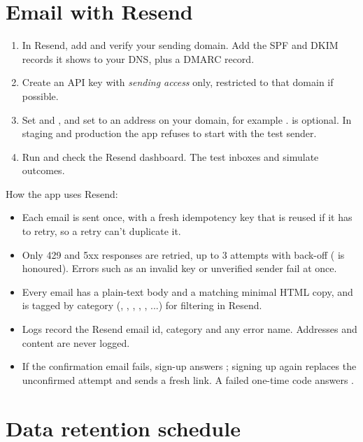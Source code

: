 \section{Email with Resend}
\label{sec:resend-prod}

\begin{enumerate}
  \item In Resend, add and verify your sending domain. Add the SPF and DKIM records it shows to your DNS, plus a DMARC record.
  \item Create an API key with \emph{sending access} only, restricted to that domain if possible.
  \item Set  and , and set  to an address on your domain, for example .  is optional. In staging and production the app refuses to start with the  test sender.
  \item Run  and check the Resend dashboard. The test inboxes  and  simulate outcomes.
\end{enumerate}

How the app uses Resend:
\begin{itemize}
  \item Each email is sent once, with a fresh idempotency key that is reused if it has to retry, so a retry can't duplicate it.
  \item Only 429 and 5xx responses are retried, up to 3 attempts with back-off ( is honoured). Errors such as an invalid key or unverified sender fail at once.
  \item Every email has a plain-text body and a matching minimal HTML copy, and is tagged by category (, , , , , ...) for filtering in Resend.
  \item Logs record the Resend email id, category and any error name. Addresses and content are never logged.
  \item If the confirmation email fails, sign-up answers ; signing up again replaces the unconfirmed attempt and sends a fresh link. A failed one-time code answers .
\end{itemize}

\section{Data retention schedule}

